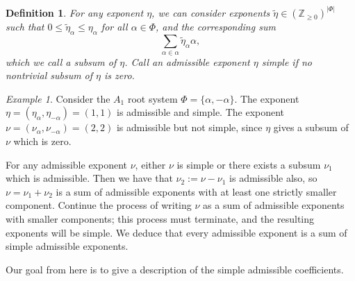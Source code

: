\documentclass[12pt]{amsart}
\newcommand{\Z}{\mathbb{Z}}
\newtheorem{definition}[theorem]{Definition}
\theoremstyle{remark}
\theoremstyle{remark}
\newtheorem*{example}{Example}
\theoremstyle{remark}
\begin{document}
\begin{definition}
For any exponent $\eta$, we can consider exponents $\tilde \eta \in (\Z_{\ge 0})^{|\Phi|}$ such that $0 \le \tilde \eta_\alpha \le \eta_\alpha$ for all $\alpha \in \Phi$, and the corresponding sum
$$\sum_{\alpha\in \alpha} \tilde \eta_\alpha \alpha,$$
which we call a \emph{subsum} of $\eta$.
Call an admissible exponent $\eta$ \emph{simple} if no nontrivial subsum of $\eta$ is zero.
\end{definition}

\begin{example}
    Consider the $A_1$ root system $\Phi=\{\alpha,-\alpha\}$.
    The exponent $\eta=(\eta_\alpha, \eta_{-\alpha}) = (1, 1)$ is admissible and simple.
    The exponent $\nu=(\nu_\alpha, \nu_{-\alpha}) = (2, 2)$ is admissible but not simple, since $\eta$ gives a subsum of $\nu$ which is zero.
\end{example}

For any admissible exponent $\nu$, either $\nu$ is simple or there exists a subsum $\nu_1$ which is admissible.
Then we have that $\nu_2 := \nu - \nu_1$ is admissible also, so $\nu = \nu_1 + \nu_2$ is a sum of admissible exponents with at least one strictly smaller component.
Continue the process of writing $\nu$ as a sum of admissible exponents with smaller components; this process must terminate, and the resulting exponents will be simple.
We deduce that every admissible exponent is a sum of simple admissible exponents.

Our goal from here is to give a description of the simple admissible coefficients.
\end{document}
